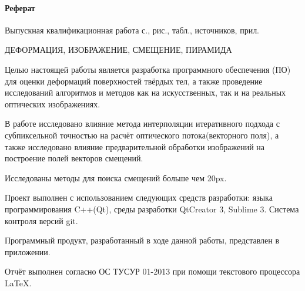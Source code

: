 \newpage
{}
\paragraph{\hfill Реферат \hfill}
Выпускная квалификационная работа  с.,  рис.,  табл.,  источников,  прил.

ДЕФОРМАЦИЯ, ИЗОБРАЖЕНИЕ, СМЕЩЕНИЕ, ПИРАМИДА

Целью настоящей работы является разработка программного обеспечения (ПО) для оценки деформаций поверхностей твёрдых тел, а также проведение исследований алгоритмов и методов как на искусственных, так и на реальных оптических изображениях.

В работе исследовано влияние метода интерполяции итеративного подхода с субпиксельной точностью на расчёт оптического потока(векторного поля), а также исследовано влияние предварительной обработки изображений на построение полей векторов смещений.

Исследованы методы для поиска смещений больше чем 20px. 

 

Проект выполнен с использованием следующих средств разработки: языка программирования C++(Qt), среды разработки QtCreator 3, Sublime 3. Система контроля версий git.

Программный продукт, разработанный в ходе данной работы, представлен в приложении.

Отчёт выполнен согласно ОС ТУСУР 01-2013 при помощи текстового процессора \LaTeX.